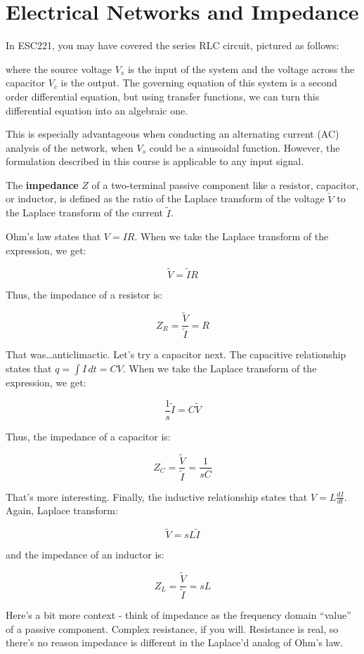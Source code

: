 \documentclass[
  letterpaper,
  DIV=11,
  numbers=noendperiod]{scrreprt}
\begin{document}
\hypertarget{electrical-networks-and-impedance}{%
\section{Electrical Networks and
Impedance}\label{electrical-networks-and-impedance}}

In ESC221, you may have covered the series RLC circuit, pictured as
follows:

where the source voltage \(V_s\) is the input of the system and the
voltage across the capacitor \(V_c\) is the output. The governing
equation of this system is a second order differential equation, but
using transfer functions, we can turn this differential equation into an
algebraic one.

This is especially advantageous when conducting an alternating current
(AC) analysis of the network, when \(V_s\) could be a sinusoidal
function. However, the formulation described in this course is
applicable to any input signal.

The \textbf{impedance} \(Z\) of a two-terminal passive component like a
resistor, capacitor, or inductor, is defined as the ratio of the Laplace
transform of the voltage \(\tilde{V}\) to the Laplace transform of the
current \(\tilde{I}\).

Ohm's law states that \(V = IR\). When we take the Laplace transform of
the expression, we get:

\[\tilde{V} = \tilde{I} R\]

Thus, the impedance of a resistor is:

\[Z_R = \frac{\tilde{V}}{\tilde{I}} = R\]

That was\ldots anticlimactic. Let's try a capacitor next. The capacitive
relationship states that \(q = \int I \, dt = CV\). When we take the
Laplace transform of the expression, we get:

\[\frac{1}{s} \tilde{I} = C\tilde{V}\]

Thus, the impedance of a capacitor is:

\[Z_C = \frac{\tilde{V}}{\tilde{I}} = \frac{1}{sC}\]

That's more interesting. Finally, the inductive relationship states that
\(V = L\frac{dI}{dt}\). Again, Laplace transform:

\[\tilde{V} = s L\tilde{I}\]

and the impedance of an inductor is:

\[Z_L = \frac{\tilde{V}}{\tilde{I}} = sL\]

Here's a bit more context - think of impedance as the frequency domain
``value'' of a passive component. Complex resistance, if you will.
Resistance is real, so there's no reason impedance is different in the
Laplace'd analog of Ohm's law.
\end{document}
